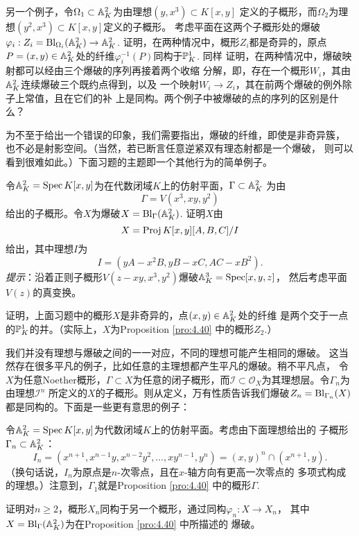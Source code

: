 \begin{exe}\label{exe:4.42}
	另一个例子，令$\Omega_1\subset \A_K^2$为由理想$(y,x^3)\subset K[x,y]$
	定义的子概形，而$\Omega_2$为理想$(y^2,x^3)\subset K[x,y]$定义的子概形。
	考虑平面在这两个子概形处的爆破$\varphi_i:Z_i=\Bl_{\Omega_i}(\A_K^2)
	\to \A_K^2$. 证明，在两种情况中，概形$Z_i$都是奇异的，原点
	$P=(x,y)\in \A_K^2$处的纤维$\varphi_i^{-1}(P)$同构于$\P_K^1$. 同样
	证明，在两种情况中，爆破映射都可以经由三个爆破的序列再接着两个收缩
	分解，即，存在一个概形$W_i$，其由$\A_K^2$连续爆破三个既约点得到，以及
	一个映射$W_i\to Z_i$，其在前两个爆破的例外除子上常值，且在它们的补
	上是同构。两个例子中被爆破的点的序列的区别是什么？
\end{exe}

为不至于给出一个错误的印象，我们需要指出，爆破的纤维，即使是非奇异簇，
也不必是射影空间。（当然，若已断言任意逆紧双有理态射都是一个爆破，
则可以看到很难如此。）下面习题的主题即一个其他行为的简单例子。

\begin{exe}\label{exe:4.43}
令$\A_K^2=\spec K[x,y]$为在代数闭域$K$上的仿射平面，$\Gamma\subset \A_K^2$
为由
\[
	\Gamma=V(x^3,xy,y^2)
\]
给出的子概形。令$X$为爆破$X=\Bl_\Gamma(\A_K^2)$. 证明$X$由
\[
	X=\proj K[x,y][A,B,C]/I
\]
给出，其中理想$I$为
\[
	I=(yA-x^2B,yB-xC,AC-xB^2).
\]
\emph{提示}：沿着正则子概形$V(z-xy,x^3,y^2)$爆破$\A_K^3=\spec [x,y,z]$，
然后考虑平面$V(z)$的真变换。
\end{exe}

\begin{exe}\label{exe:4.44}
	证明，上面习题中的概形$X$是非奇异的，点$(x,y)\in\A_K^2$处的纤维
	是两个交于一点的$\P_K^1$的并。（实际上，$X$为Proposition 
	\ref{pro:4.40} 中的概形$Z_2$.）
\end{exe}

我们并没有理想与爆破之间的一一对应，不同的理想可能产生相同的爆破。
这当然存在很多平凡的例子，比如任意的主理想都产生平凡的爆破。稍不平凡点，
令$X$为任意Noether概形，$\Gamma\subset X$为任意的闭子概形，而$\mathscr I
\subset \mathscr O_X$为其理想层。令$\Gamma_n$为由理想$\mathscr I^n$
所定义的$X$的子概形。则从定义，万有性质告诉我们爆破$Z_n=\Bl_{\Gamma_n}(X)$
都是同构的。下面是一些更有意思的例子：


\begin{exe}\label{exe:4.45}
令$\A_K^2=\spec K[x,y]$为代数闭域$K$上的仿射平面。考虑由下面理想给出的
子概形$\Gamma_n\subset \A_K^2$：
	\[
	I_n=(x^{n+1},x^{n-1}y,x^{n-2}y^2,\dots,xy^{n-1},y^n)=
	(x,y)^n\cap (x^{n+1},y).
\]
（换句话说，$I_n$为原点是$n$-次零点，且在$x$-轴方向有更高一次零点的
多项式构成的理想。）注意到，$\Gamma_1$就是Proposition \ref{pro:4.40}
中的概形$\Gamma$.

证明对$n\geq 2$，概形$X_n$同构于另一个概形，通过同构$\varphi_n:X\to X_n$，
其中$X=\Bl_{\Gamma}(\A_K^2)$为在Proposition \ref{pro:4.40} 中所描述的
爆破。
\end{exe}

